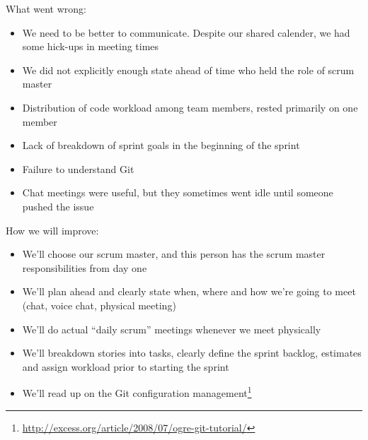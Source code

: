 \documentclass[a4paper,11pt]{article}
\begin{document}
\noindent
What went wrong:

\begin{itemize}
	\item We need to be better to communicate. Despite our shared calender, we had some hick-ups in meeting times
	\item We did not explicitly enough state ahead of time who held the role of scrum master
	\item Distribution of code workload among team members, rested primarily on one member 
	\item Lack of breakdown of sprint goals in the beginning of the sprint
	\item Failure to understand Git 
	\item Chat meetings were useful, but they sometimes went idle until someone pushed the issue
\end{itemize}

\noindent
How we will improve:
\begin{itemize}
	\item We'll choose our scrum master, and this person has the scrum master responsibilities from day one
	\item We’ll plan ahead and clearly state when, where and how we’re going to meet (chat, voice chat, physical meeting)
	\item We’ll do actual “daily scrum” meetings whenever we meet physically
	\item We’ll breakdown stories into tasks, clearly define the sprint backlog, estimates and assign workload prior to starting the sprint
	\item We'll read up on the Git configuration management\footnote{\url{http://excess.org/article/2008/07/ogre-git-tutorial/}}
\end{itemize}
\end{document}

